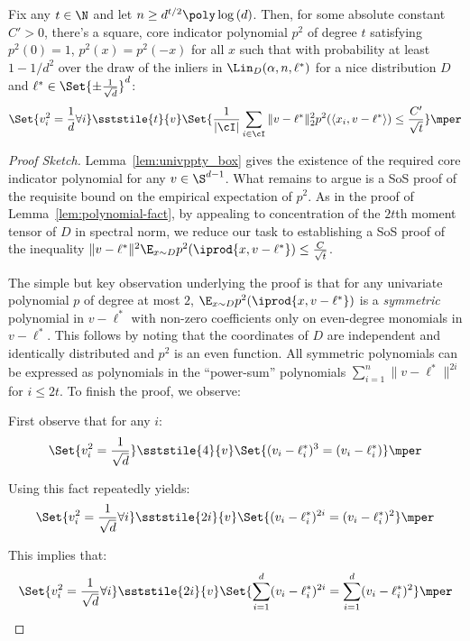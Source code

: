 \begin{lemma} \label{lem:polynomial-fact-hypercube}
Fix any $t \in \N$ and let $n \geq d^{t/2} \poly \log{(d)}$. 
Then, for some absolute constant $C' > 0$, there's a square, core indicator polynomial $p^2$ of degree $t$ satisfying $p^2(0) = 1$, $p^2(x) = p^2(-x)$ for all $x$ such that with probability at least $1-1/d^2$ over the draw of the inliers in $\Lin_D(\alpha,n,\ell^*)$ for a nice distribution $D$ and $\ell^* \in \Set{\pm \frac{1}{\sqrt{d}}}^d$:
\[
\Set{v_i^2 = \frac{1}{d} \forall i} \sststile{t}{v} \Set{\frac{1}{|\cI|} \sum_{i \in \cI} \|v-\ell^*\|_2^2 p^2(\langle x_i, v-\ell^* \rangle) \leq \frac{C'}{\sqrt{t}} }\mper
\]

\end{lemma}

\begin{proof}[Proof Sketch]
Lemma~\ref{lem:univppty_box} gives the existence of the required core indicator polynomial for any $v \in \S^{d-1}$. 
What remains to argue is a SoS proof of the requisite bound on the empirical expectation of $p^2$. 
As in the proof of Lemma~\ref{lem:polynomial-fact}, by appealing to concentration of the $2t$th moment tensor of $D$ in spectral norm, we reduce our task to establishing a SoS proof of the inequality $\|v-\ell^*\|^2\E_{x \sim D} p^2(\iprod{x,v-\ell^*}) \leq \frac{C}{\sqrt{t}}$.

The simple but key observation underlying the proof is that for any univariate polynomial $p$ of degree at most $2$, $\E_{x \sim D} p^2(\iprod{x,v-\ell^*})$ is a \emph{symmetric} polynomial in $v-\ell^*$ with non-zero coefficients only on even-degree monomials in $v-\ell^*$. This follows by noting that the coordinates of $D$ are independent and identically distributed and $p^2$ is an even function. All symmetric polynomials can be expressed as polynomials in the ``power-sum'' polynomials $\sum_{i = 1}^n \|v-\ell^*\|^{2i}$ for $i \leq 2t$. To finish the proof, we observe:

First observe that for any $i$:
\[
\Set{v_i^2 = \frac{1}{\sqrt{d}} } \sststile{4}{v} \Set{(v_i -\ell^*_i)^3 = (v_i - \ell^*_i)} \mper
\]

Using this fact repeatedly yields:
\[
\Set{v_i^2 = \frac{1}{\sqrt{d}} \forall i} \sststile{2i}{v} \Set{(v_i -\ell^*_i)^{2i} = (v_i - \ell^*_i)^2} \mper
\]

This implies that:
\[
\Set{v_i^2 = \frac{1}{\sqrt{d}} \forall i} \sststile{2i}{v} \Set{\sum_{i =1}^d(v_i -\ell^*_i)^{2i} = \sum_{i = 1}^d(v_i - \ell^*_i)^2} \mper
\]


\end{proof}
